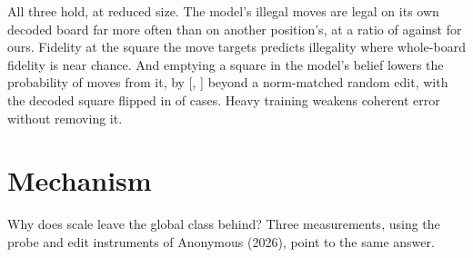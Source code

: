 \documentclass[11pt]{article}
\newcommand{\priort}{Anonymous (2026)}
\newcommand{\priort}{\citet{rathore2026coherent}}
\begin{document}
All three hold, at reduced size. The model's illegal moves are legal on its own
decoded board far more often than on another position's, at a ratio of
 against  for ours. Fidelity at the square
the move targets predicts illegality where whole-board fidelity is near chance.
And emptying a square in the model's belief lowers the probability of moves from
it, by  [, ] beyond a
norm-matched random edit, with the decoded square flipped in  of
cases. Heavy training weakens coherent error without removing it.

\section{Mechanism}
\label{sec:mech}

Why does scale leave the global class behind? Three measurements, using the probe
and edit instruments of \priort, point to the same answer.
\end{document}
